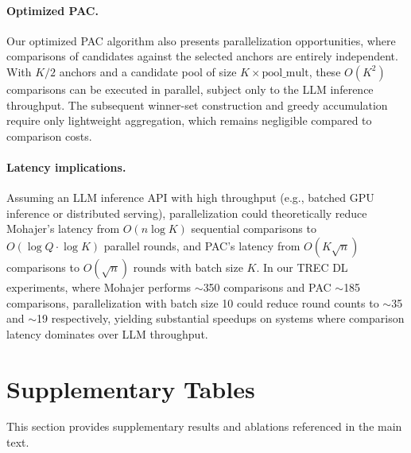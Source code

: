 \documentclass[11pt]{article}
\begin{document}
\paragraph{Optimized PAC.}
Our optimized PAC algorithm also presents parallelization opportunities, where comparisons of candidates against the selected anchors are entirely independent.
With $K/2$ anchors and a candidate pool of size $K \times \text{pool\_mult}$, these $O(K^2)$ comparisons can be executed in parallel, subject only to the LLM inference throughput.
The subsequent winner-set construction and greedy accumulation require only lightweight aggregation, which remains negligible compared to comparison costs.

\paragraph{Latency implications.}
Assuming an LLM inference API with high throughput (e.g., batched GPU inference or distributed serving), parallelization could theoretically reduce Mohajer's latency from $O(n \log K)$ sequential comparisons to $O(\log Q \cdot \log K)$ parallel rounds, and PAC's latency from $O(K \sqrt{n})$ comparisons to $O(\sqrt{n})$ rounds with batch size $K$.
In our TREC DL experiments, where Mohajer performs $\sim$350 comparisons and PAC $\sim$185 comparisons, parallelization with batch size 10 could reduce round counts to $\sim$35 and $\sim$19 respectively, yielding substantial speedups on systems where comparison latency dominates over LLM throughput.


\section{Supplementary Tables}
\label{sec:appendix}
\FloatBarrier

\FloatBarrier

\noindent This section provides supplementary results and ablations referenced in the main text.
\vspace{0.5em}

\begingroup

\setcounter{topnumber}{5}
\setcounter{bottomnumber}{5}
\setcounter{totalnumber}{10}
\renewcommand{\topfraction}{0.95}
\renewcommand{\bottomfraction}{0.95}
\renewcommand{\textfraction}{0.05}
\renewcommand{\floatpagefraction}{0.95}

\setlength{\textfloatsep}{10pt plus 2pt minus 2pt}
\setlength{\floatsep}{8pt plus 2pt minus 2pt}
\setlength{\intextsep}{8pt plus 2pt minus 2pt}
\renewcommand{\arraystretch}{1.08}
\setlength{\tabcolsep}{3.5pt}
\end{document}
